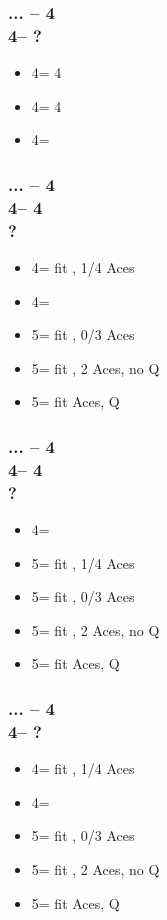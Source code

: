 \subsubsection*{... -- 4\clubs\\
                4\diams -- ?}
\begin{itemize}
    \item 4\hearts = 4\clubs
    \item 4\spades = 4\diams
    \item 4\nt = \soff
\end{itemize}

\subsubsection*{... -- 4\clubs\\
                4\diams -- 4\hearts\\
                ?}
\begin{itemize}
    \item 4\spades = fit \clubs, 1/4 Aces
    \item 4\nt = \soff
    \item 5\clubs = fit \clubs, 0/3 Aces
    \item 5\diams = fit \clubs, 2 Aces, no Q\clubs
    \item 5\hearts = fit  Aces, Q\clubs
\end{itemize}

\subsubsection*{... -- 4\clubs\\
                4\diams -- 4\spades\\
                ?}
\begin{itemize}
    \item 4\nt = \soff
    \item 5\clubs = fit \diams, 1/4 Aces
    \item 5\diams = fit \diams, 0/3 Aces
    \item 5\hearts = fit \diams, 2 Aces, no Q\diams
    \item 5\spades = fit  Aces, Q\diams
\end{itemize}

\subsubsection*{... -- 4\clubs\\
                4\hearts -- ?}
\begin{itemize}
    \item 4\spades = fit \clubs, 1/4 Aces
    \item 4\nt = \soff
    \item 5\clubs = fit \clubs, 0/3 Aces
    \item 5\diams = fit \clubs, 2 Aces, no Q\clubs
    \item 5\hearts = fit  Aces, Q\clubs
\end{itemize}


